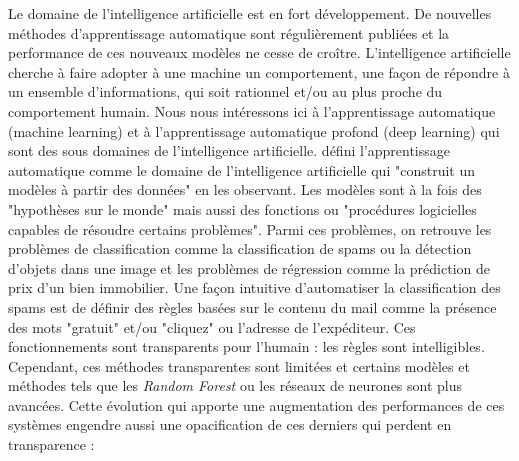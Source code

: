\documentclass{report}
\newcommand{\alh}[1]{\textcolor{teal}{#1}}
\begin{document}
    
    Le domaine de l'intelligence artificielle est en fort développement. De nouvelles méthodes d'apprentissage automatique sont régulièrement publiées et la performance de ces nouveaux modèles ne cesse de croître. L'intelligence artificielle cherche à faire adopter à une machine un comportement, une façon de répondre à un ensemble d'informations, qui soit rationnel et/ou au plus proche du comportement humain. Nous nous intéressons ici à l'apprentissage automatique (machine learning) et à l'apprentissage automatique profond (deep learning) qui sont des sous domaines de l'intelligence artificielle. \cite[Chap~19]{russell_intelligence_2021} défini l'apprentissage automatique comme le domaine de l'intelligence artificielle qui "construit un modèles à partir des données" en les observant. Les modèles sont à la fois des "hypothèses sur le monde" mais aussi des fonctions ou "procédures logicielles capables de résoudre certains problèmes". 
    Parmi ces problèmes, on retrouve les problèmes de classification comme la classification de spams ou la détection d'objets dans une image et les problèmes de régression comme la prédiction de prix d'un bien immobilier.
    Une façon intuitive d'automatiser la classification des spams est de définir des règles basées sur le contenu du mail comme la présence des mots "gratuit" et/ou "cliquez" ou l'adresse de l'expéditeur. Ces fonctionnements sont transparents pour l'humain : les règles sont intelligibles. Cependant, ces méthodes transparentes sont limitées et certains modèles et méthodes tels que les \emph{Random Forest} ou les réseaux de neurones sont plus avancées. Cette évolution qui apporte une augmentation des performances de ces systèmes engendre aussi une opacification de ces derniers qui perdent en transparence : 
\end{document}
